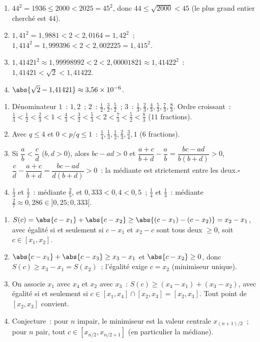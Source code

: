 \begin{enumerate}
  \item $44^2=1936\le2000<2025=45^2$, donc $44\le\sqrt{2000}<45$ (le plus grand entier cherch\'e est $44$).
  \item $1{,}41^2=1{,}9881<2<2{,}0164=1{,}42^2$~; $1{,}414^2=1{,}999396<2<2{,}002225=1{,}415^2$.
  \item $1{,}41421^2\approx1{,}99998992<2<2{,}00001821\approx1{,}41422^2$~: $1{,}41421<\sqrt2<1{,}41422$.
  \item $\abs{\sqrt2-1{,}41421}\approx3{,}56\times10^{-6}$.
\end{enumerate}
\begin{enumerate}
  \item D\'enominateur $1$~: $1,2$~; $2$~: $\tfrac12,\tfrac32,\tfrac52$~; $3$~: $\tfrac13,\tfrac23,\tfrac43,\tfrac53,\tfrac73,\tfrac83$.
        Ordre croissant~: $\tfrac13<\tfrac12<\tfrac23<1<\tfrac43<\tfrac32<\tfrac53<2<\tfrac73<\tfrac52<\tfrac83$ ($11$ fractions).
  \item Avec $q\le4$ et $0<p/q\le1$~: $\tfrac14,\tfrac13,\tfrac12,\tfrac23,\tfrac34,1$ ($6$ fractions).
  \item Si $\dfrac ab<\dfrac cd$ ($b,d>0$), alors $bc-ad>0$ et
        $\dfrac{a+c}{b+d}-\dfrac ab=\dfrac{bc-ad}{b(b+d)}>0$, $\dfrac cd-\dfrac{a+c}{b+d}=\dfrac{bc-ad}{d(b+d)}>0$~: la m\'ediante est strictement entre les deux.\hfill$\square$
  \item $\tfrac13$ et $\tfrac12$~: m\'ediante $\tfrac25$, et $0{,}333<0{,}4<0{,}5$~; $\tfrac14$ et $\tfrac13$~: m\'ediante $\tfrac27\approx0{,}286\in]0{,}25;0{,}333[$.
\end{enumerate}
\begin{enumerate}
  \item $S(c)=\abs{c-x_1}+\abs{c-x_2}\ge\abs{(c-x_1)-(c-x_2)}=x_2-x_1$, avec \'egalit\'e si et seulement si $c-x_1$ et $x_2-c$ sont tous deux $\ge0$, soit $c\in[x_1,x_2]$.
  \item $\abs{c-x_1}+\abs{c-x_3}\ge x_3-x_1$ et $\abs{c-x_2}\ge0$, donc $S(c)\ge x_3-x_1=S(x_2)$~; l'\'egalit\'e exige $c=x_2$ (minimiseur unique).
  \item On associe $x_1$ avec $x_4$ et $x_2$ avec $x_3$~: $S(c)\ge(x_4-x_1)+(x_3-x_2)$, avec \'egalit\'e si et seulement si $c\in[x_1,x_4]\cap[x_2,x_3]=[x_2,x_3]$. Tout point de $[x_2,x_3]$ convient.
  \item Conjecture~: pour $n$ impair, le minimiseur est la valeur centrale $x_{(n+1)/2}$~; pour $n$ pair, tout $c\in[x_{n/2},x_{n/2+1}]$ (en particulier la m\'ediane).
\end{enumerate}
